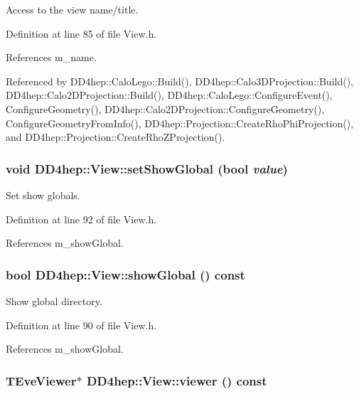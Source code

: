 Access to the view name/title. 

Definition at line 85 of file View.h.

References m\_\-name.

Referenced by DD4hep::CaloLego::Build(), DD4hep::Calo3DProjection::Build(), DD4hep::Calo2DProjection::Build(), DD4hep::CaloLego::ConfigureEvent(), ConfigureGeometry(), DD4hep::Calo2DProjection::ConfigureGeometry(), ConfigureGeometryFromInfo(), DD4hep::Projection::CreateRhoPhiProjection(), and DD4hep::Projection::CreateRhoZProjection().\hypertarget{class_d_d4hep_1_1_view_a76019e28799e7a10d7678a251edb198d}{
\subsubsection[{setShowGlobal}]{\setlength{\rightskip}{0pt plus 5cm}void DD4hep::View::setShowGlobal (bool {\em value})}}
\label{class_d_d4hep_1_1_view_a76019e28799e7a10d7678a251edb198d}


Set show globals. 

Definition at line 92 of file View.h.

References m\_\-showGlobal.\hypertarget{class_d_d4hep_1_1_view_a957244259051281c5bdb7e0a2cf264a4}{
\subsubsection[{showGlobal}]{\setlength{\rightskip}{0pt plus 5cm}bool DD4hep::View::showGlobal () const}}
\label{class_d_d4hep_1_1_view_a957244259051281c5bdb7e0a2cf264a4}


Show global directory. 

Definition at line 90 of file View.h.

References m\_\-showGlobal.\hypertarget{class_d_d4hep_1_1_view_aeb1961cc6b9bbe466a81dc6f61833029}{
\subsubsection[{viewer}]{\setlength{\rightskip}{0pt plus 5cm}TEveViewer$\ast$ DD4hep::View::viewer () const}}
\label{class_d_d4hep_1_1_view_aeb1961cc6b9bbe466a81dc6f61833029}



